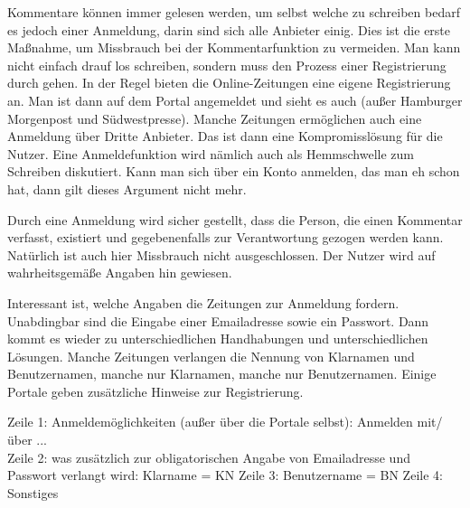 Kommentare können immer gelesen werden, um selbst welche zu schreiben bedarf es jedoch einer Anmeldung, darin sind sich alle Anbieter einig. Dies ist die erste Maßnahme, um Missbrauch bei der Kommentarfunktion zu vermeiden. Man kann nicht einfach drauf los schreiben, sondern muss den Prozess einer Registrierung durch gehen. In der Regel bieten die Online-Zeitungen eine eigene Registrierung an. Man ist dann auf dem Portal angemeldet und sieht es auch (außer Hamburger Morgenpost und Südwestpresse). Manche Zeitungen ermöglichen auch eine Anmeldung über Dritte Anbieter. Das ist dann eine Kompromisslösung für die Nutzer. Eine Anmeldefunktion wird nämlich auch als Hemmschwelle zum Schreiben diskutiert. Kann man sich über ein Konto anmelden, das man eh schon hat, dann gilt dieses Argument nicht mehr. 

Durch eine Anmeldung wird sicher gestellt, dass die Person, die einen Kommentar verfasst, existiert und gegebenenfalls zur Verantwortung gezogen werden kann. Natürlich ist auch hier Missbrauch nicht ausgeschlossen. Der Nutzer wird auf wahrheitsgemäße Angaben hin gewiesen. 

Interessant ist, welche Angaben die Zeitungen zur Anmeldung fordern. Unabdingbar sind die Eingabe einer Emailadresse sowie ein Passwort. Dann kommt es wieder zu unterschiedlichen Handhabungen und unterschiedlichen Lösungen. Manche Zeitungen verlangen die Nennung von Klarnamen und Benutzernamen, manche nur Klarnamen, manche nur Benutzernamen. Einige Portale geben zusätzliche Hinweise zur Registrierung. 

Zeile 1: Anmeldemöglichkeiten (außer über die Portale selbst): Anmelden mit/über ... \\
Zeile 2: was zusätzlich zur obligatorischen Angabe von Emailadresse und Passwort verlangt wird: Klarname = KN
Zeile 3: Benutzername = BN
Zeile 4: Sonstiges
	
